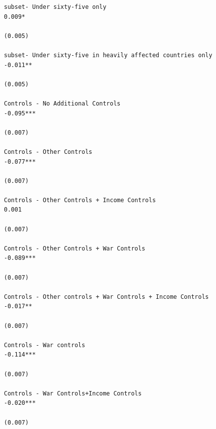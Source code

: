 \documentclass[
  letterpaper,
  DIV=11,
  numbers=noendperiod]{scrartcl}
\begin{document}
\begin{verbatim}
subset- Under sixty-five only                                         0.009*           
                                                                      (0.005)          
                                                                                       
subset- Under sixty-five in heavily affected countries only          -0.011**          
                                                                      (0.005)          
                                                                                       
Controls - No Additional Controls                                    -0.095***         
                                                                      (0.007)          
                                                                                       
Controls - Other Controls                                            -0.077***         
                                                                      (0.007)          
                                                                                       
Controls - Other Controls + Income Controls                            0.001           
                                                                      (0.007)          
                                                                                       
Controls - Other Controls + War Controls                             -0.089***         
                                                                      (0.007)          
                                                                                       
Controls - Other controls + War Controls + Income Controls           -0.017**          
                                                                      (0.007)          
                                                                                       
Controls - War controls                                              -0.114***         
                                                                      (0.007)          
                                                                                       
Controls - War Controls+Income Controls                              -0.020***         
                                                                      (0.007)          
                                                                                       

\end{verbatim}
\end{document}
